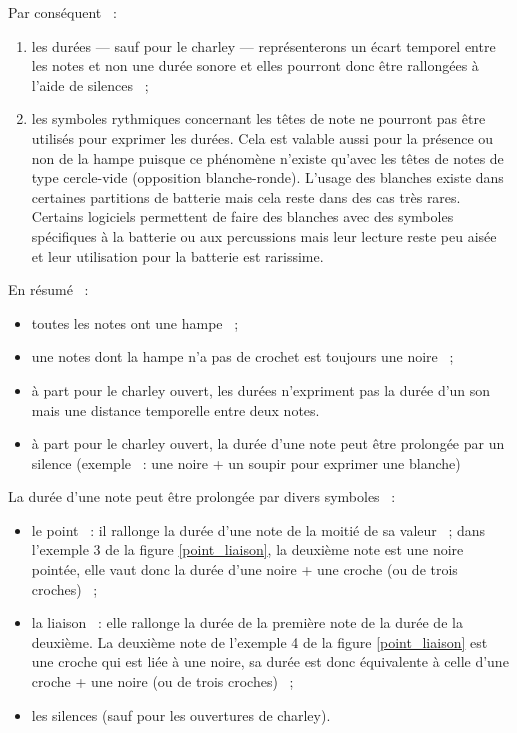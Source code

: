 Par conséquent~ :
\begin{enumerate}
    \item les durées — sauf pour le charley — représenterons un écart temporel
        entre les notes et non une durée sonore et elles pourront donc être
        rallongées à l’aide de silences~ ;
    \item les symboles rythmiques concernant les têtes de note ne pourront pas
        être utilisés pour exprimer les durées. Cela est valable aussi pour la
        présence ou non de la hampe puisque ce phénomène n’existe qu’avec les
        têtes de notes de type cercle-vide (opposition blanche-ronde). L’usage
        des blanches existe dans certaines partitions de batterie
        \cite{system_drums} mais cela reste dans des cas très rares. Certains
        logiciels permettent de faire des blanches avec des symboles
        spécifiques à la batterie ou aux percussions mais leur lecture reste
        peu aisée et leur utilisation pour la batterie est rarissime.\\
\end{enumerate}

En résumé~ :
\begin{itemize}
    \item toutes les notes ont une hampe~ ;
    \item une notes dont la hampe n’a pas de crochet est toujours une noire~ ;
    \item à part pour le charley ouvert, les durées n’expriment pas la durée
        d’un son mais une distance temporelle entre deux notes.
    \item à part pour le charley ouvert, la durée d’une note peut être
        prolongée par un silence (exemple~ : une noire + un soupir pour exprimer
        une blanche)\\
\end{itemize}
La durée d’une note peut être prolongée par divers symboles~ :
\begin{itemize}
	\item le point~ : il rallonge la durée d’une note de la moitié de sa valeur~ ;
        dans l’exemple 3 de la figure \ref{point_liaison}, la deuxième note
        est une noire pointée, elle vaut donc la durée d’une noire + une croche
        (ou de trois croches)~ ;
	\item la liaison~ : elle rallonge la durée de la première note de la durée
        de la deuxième. La deuxième note de l’exemple 4 de la figure
        \ref{point_liaison} est une croche qui est liée à une noire, sa durée
        est donc équivalente à celle d’une croche + une noire (ou de trois
        croches)~ ;
    \item les silences (sauf pour les ouvertures de charley).\\
\end{itemize}

